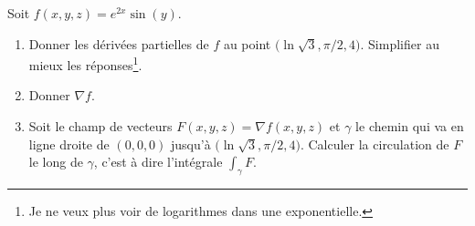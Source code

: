 
\begin{exercice}\label{exoreserve0007}

    Soit \( f(x,y,z)= e^{2x}\sin(y)\).
    \begin{enumerate}
        \item
            Donner les dérivées partielles de \( f\) au point \( \big( \ln\sqrt{3},\pi/2,4 \big)\). Simplifier au mieux les réponses\footnote{Je ne veux plus voir de logarithmes dans une exponentielle.}.
        \item
            Donner \( \nabla f\).
        \item
            Soit le champ de vecteurs \( F(x,y,z)=\nabla f(x,y,z)\) et \( \gamma\) le chemin qui va en ligne droite de \( (0,0,0)\) jusqu'à \( \big( \ln\sqrt{3},\pi/2,4 \big)\). Calculer la circulation de \( F\) le long de \( \gamma\), c'est à dire l'intégrale \( \int_{\gamma}F\).

    \end{enumerate}

\end{exercice}
